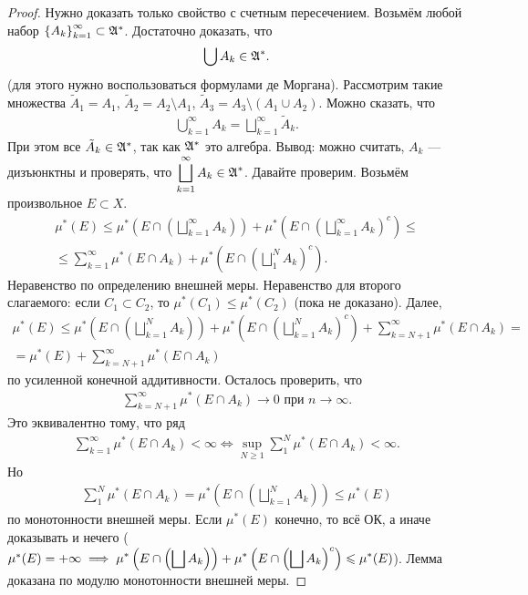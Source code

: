 \documentclass[a4paper,14pt]{extarticle}
\theoremstyle{definition}
\theoremstyle{plain}
\theoremstyle{plain}
\theoremstyle{plain}
\theoremstyle{plain}
\theoremstyle{definition}
\theoremstyle{definition}
\theoremstyle{definition}
\theoremstyle{definition}
\theoremstyle{definition}
\theoremstyle{definition}
\theoremstyle{plain}
\theoremstyle{plain}
\theoremstyle{plain}
\theoremstyle{plain}
\theoremstyle{definition}
\theoremstyle{definition}
\theoremstyle{definition}
\theoremstyle{definition}
\theoremstyle{definition}
\newcommand{\then}{\ensuremath \implies}
\newcommand{\A}{\ensuremath \mathfrak{A}}
\begin{document}
\begin{proof}
 Нужно доказать только свойство с счетным пересечением. Возьмём любой набор $ \left\{ A_k \right\}_{k=1}^\infty \subset \A^\ast $. Достаточно доказать, что
 \begin{align*}
  \bigcup A_k \in \A^\ast
 .\end{align*} (для этого нужно воспользоваться формулами де Моргана). Рассмотрим такие множества $ \tilde A_1 = A_1 $, $ \tilde A_2 = A_2 \setminus A_1 $, $ \tilde A_3 = A_3 \setminus (A_1 \cup A_2)$. Можно сказать, что
 \begin{align*}
  \bigcup_{k=1}^\infty A_k = \bigsqcup_{k=1}^\infty \tilde A_k
 .\end{align*} При этом все $ \tilde A_k \in \A^\ast $, так как $ \A^\ast $ это алгебра. Вывод: можно считать, $ A_k $ --- дизъюнктны и проверять, что $ \displaystyle \bigsqcup_{k=1}^\infty A_k \in \A^\ast $. Давайте проверим. Возьмём произвольное $ E \subset X $.
 \begin{align*}
  \mu^\ast(E) \leqslant \mu^\ast\left( E \cap \left( \bigsqcup_{k=1}^\infty A_k \right) \right) + \mu^\ast\left( E \cap \left( \bigsqcup_{k=1}^\infty A_k \right)^c \right) \leqslant \\
  \leqslant \sum_{k=1}^{\infty} \mu^\ast(E \cap A_k) + \mu^\ast\left( E \cap \left( \bigsqcup_1^N A_k \right)^c \right)
 .\end{align*} Неравенство по определению внешней меры. Неравенство для второго слагаемого: если $ C_1 \subset C_2 $, то $ \mu^\ast(C_1) \leqslant \mu^\ast(C_2) $ (пока не доказано).
 Далее,
 \begin{align*}
  \mu^\ast(E) \leqslant \mu^\ast\left( E \cap \left( \bigsqcup_{k=1}^N A_k \right) \right) + \mu^\ast\left( E \cap \left( \bigsqcup_{k=1}^N A_k \right)^c\right) + \sum_{k=N+1}^{\infty} \mu^\ast(E \cap A_k) = \\
  = \mu^\ast(E) + \sum_{k=N+1}^{\infty} \mu^\ast(E \cap A_k)
 \end{align*} по усиленной конечной аддитивности. Осталось проверить, что
 \begin{align*}
  \sum_{k=N+1}^{\infty} \mu^\ast(E \cap A_k) \to 0 \text{ при } n \to \infty
 .\end{align*} Это эквивалентно тому, что ряд
 \begin{align*}
  \sum_{k=1}^{\infty}  \mu^\ast (E \cap A_k) < \infty \iff \sup_{N \geqslant 1} \sum_1^N \mu^\ast(E \cap A_k) < \infty
 .\end{align*} Но
 \begin{align*}
  \sum_{1}^{N} \mu^\ast(E \cap A_k) = \mu^\ast\left(E \cap \left(\bigsqcup_{k=1}^N A_k\right)\right) \leqslant \mu^\ast(E)
 \end{align*} по монотонности внешней меры. Если $ \mu^\ast(E) $ конечно, то всё ОК, а иначе доказывать и нечего ($ \mu^\ast(E) = +\infty \then \displaystyle \mu^\ast\left(E \cap \left( \bigsqcup A_k \right)\right)  + \mu^\ast\left(E \cap \left( \bigsqcup A_k \right)^c\right) \leqslant \mu^\ast(E)$). Лемма доказана по модулю монотонности внешней меры.
\end{proof}
\end{document}

